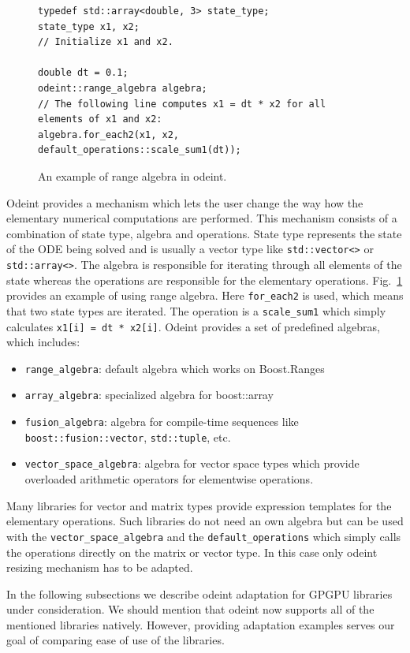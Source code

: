 \documentclass[1p]{elsarticle}
\newcommand{\code}[1]{\lstinline|#1|}
\newcommand{\figref}[1]{Fig.~\ref{#1}}
\begin{document}
\begin{figure}
\begin{lstlisting}
typedef std::array<double, 3> state_type;
state_type x1, x2;
// Initialize x1 and x2.

double dt = 0.1;
odeint::range_algebra algebra;
// The following line computes x1 = dt * x2 for all elements of x1 and x2:
algebra.for_each2(x1, x2, default_operations::scale_sum1(dt));
\end{lstlisting}
\caption{An example of range algebra in odeint.}
\label{fig:odeintops}
\end{figure}

Odeint provides a mechanism which lets the user change the way how the
elementary numerical computations are performed. This mechanism consists of a
combination of state type, algebra and operations. State type represents the
state of the ODE being solved and is usually a vector type like
\code{std::vector<>} or \code{std::array<>}. The algebra is responsible for
iterating through all elements of the state whereas the operations are
responsible for the elementary operations. \figref{fig:odeintops} provides an
example of using range algebra. Here \code{for_each2} is used, which means that
two state types are iterated. The operation is a \code{scale_sum1} which simply
calculates \code{x1[i] = dt * x2[i]}. Odeint provides a set of predefined
algebras, which includes:
\begin{itemize}
    \item \code{range_algebra}: default algebra which works on Boost.Ranges
    \item \code{array_algebra}: specialized algebra for boost::array
    \item \code{fusion_algebra}: algebra for compile-time sequences like
        \code{boost::fusion::vector}, \code{std::tuple}, etc.
    \item \code{vector_space_algebra}: algebra for vector space types which
        provide overloaded arithmetic operators for elementwise operations.
\end{itemize}

Many libraries for vector and matrix types provide expression templates for the
elementary operations. Such libraries do not need an own algebra but can be
used with the \code{vector_space_algebra} and the \code{default_operations}
which simply calls the operations directly on the matrix or vector type. In
this case only odeint resizing mechanism has to be adapted.

In the following subsections we describe odeint adaptation for GPGPU libraries
under consideration. We should mention that odeint now supports all of the
mentioned libraries natively. However, providing adaptation examples serves our
goal of comparing ease of use of the libraries.
\end{document}
